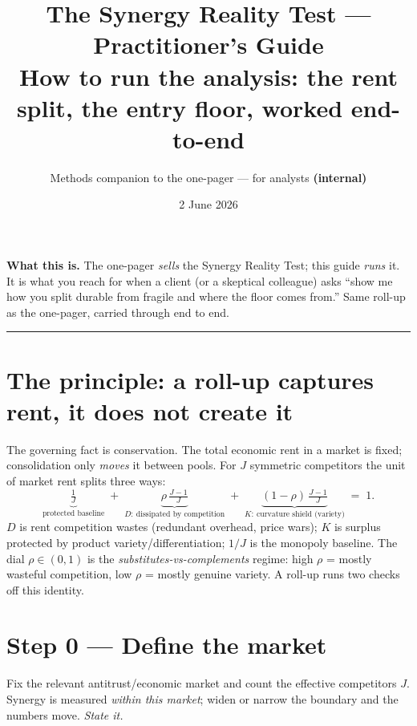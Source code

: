 \documentclass[11pt]{article}
\title{\textbf{\color{creonavy} The Synergy Reality Test --- Practitioner's Guide}\\[3pt]
\large How to run the analysis: the rent split, the entry floor, worked end-to-end}
\author{\normalsize Methods companion to the one-pager --- for analysts \textbf{(internal)}}
\date{\normalsize 2 June 2026}
\begin{document}
\maketitle
\vspace{-1.5em}

\begin{note}
\textbf{What this is.} The one-pager \emph{sells} the Synergy Reality Test; this guide
\emph{runs} it. It is what you reach for when a client (or a skeptical colleague) asks ``show
me how you split durable from fragile and where the floor comes from.'' Same roll-up as the
one-pager, carried through end to end.
\end{note}

\tableofcontents
\vspace{0.6em}\hrule\vspace{0.8em}

\section{The principle: a roll-up captures rent, it does not create it}
The governing fact is conservation. The total economic rent in a market is fixed;
consolidation only \emph{moves} it between pools. For $J$ symmetric competitors the unit of
market rent splits three ways:
\[
  \underbrace{\tfrac{1}{J}}_{\text{protected baseline}}
  \;+\;
  \underbrace{\rho\,\tfrac{J-1}{J}}_{D:\ \text{dissipated by competition}}
  \;+\;
  \underbrace{(1-\rho)\,\tfrac{J-1}{J}}_{K:\ \text{curvature shield (variety)}}
  \;=\;1 .
\]
$D$ is rent competition wastes (redundant overhead, price wars); $K$ is surplus protected by
product variety/differentiation; $1/J$ is the monopoly baseline. The dial $\rho\in(0,1)$ is
the \emph{substitutes-vs-complements} regime: high $\rho$ = mostly wasteful competition,
low $\rho$ = mostly genuine variety. A roll-up runs two checks off this identity.

\section{Step 0 --- Define the market}
Fix the relevant antitrust/economic market and count the effective competitors $J$. Synergy
is measured \emph{within this market}; widen or narrow the boundary and the numbers move.
\emph{State it.}
\end{document}
